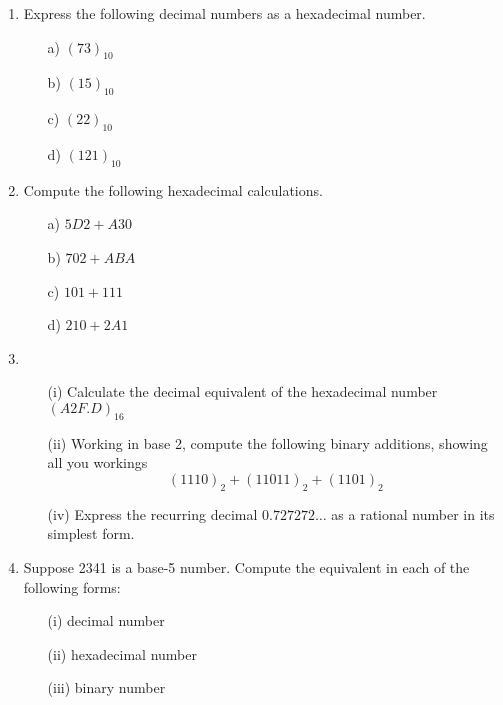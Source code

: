 \documentclass[]{article}
\begin{document}
\begin{enumerate}




	
	\item Express the following decimal numbers as a hexadecimal number.
	\begin{multicols}{4}
		\begin{itemize}
			\item[a)] $(73)_{10}$
			\item[b)] $(15)_{10}$
			\item[c)] $(22)_{10}$
			\item[d)] $(121)_{10}$
		\end{itemize}
	\end{multicols}
	
	
	\item Compute the following hexadecimal calculations.
	\begin{multicols}{4}
		\begin{itemize}
			\item[a)] $5D2+A30$
			\item[b)] $702+ABA$
			\item[c)] $101+111$
			\item[d)] $210+2A1$
		\end{itemize}
	\end{multicols}
	
\item 
\begin{itemize}
\item[(i)] Calculate the decimal equivalent of the hexadecimal number $(A2F.D)_{16}$
\item[(ii)] Working in base 2, compute the following binary additions, showing all you workings
\[(1110)_2 + (11011)_2 + (1101)_2 \]
\item[(iv)] Express the recurring decimal $0.727272\ldots$ as a rational number in its simplest form.
\end{itemize}


\item %
Suppose 2341 is a base-5 number.
Compute the equivalent in each of the following forms:
\begin{itemize}
\item[(i)] decimal number
\item[(ii)] hexadecimal number
\item[(iii)] binary number
\end{itemize}


\end{enumerate}
\end{document}

